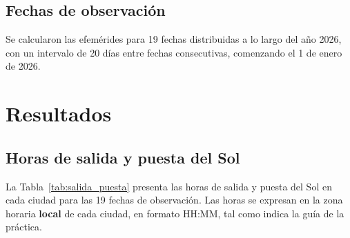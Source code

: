 \subsection{Fechas de observación}

Se calcularon las efemérides para 19 fechas distribuidas a lo largo del año 2026, con
un intervalo de 20 días entre fechas consecutivas, comenzando el 1 de enero de 2026.

\section{Resultados}

\subsection{Horas de salida y puesta del Sol}

La Tabla~\ref{tab:salida_puesta} presenta las horas de salida y puesta del Sol en cada
ciudad para las 19 fechas de observación.
Las horas se expresan en la zona horaria \textbf{local} de cada ciudad, en formato
HH:MM, tal como indica la guía de la práctica.

